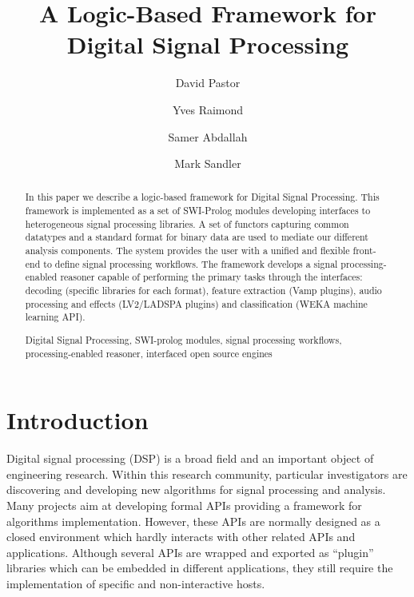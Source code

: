 \documentclass[runningheads]{llncs}
\newcommand{\keywords}[1]{\par\addvspace\baselineskip
\noindent\keywordname\enspace\ignorespaces#1}
\begin{document}
\mainmatter

\title{A Logic-Based Framework for Digital Signal Processing}


\author{David Pastor\and Yves Raimond\and Samer Abdallah\and Mark Sandler}


\maketitle


\begin{abstract}
In this paper we describe a logic-based framework for Digital Signal Processing. This framework is implemented as a set of SWI-Prolog modules developing interfaces to heterogeneous signal processing libraries. A set of functors capturing common datatypes and a standard format for binary data are used to mediate our different analysis components. The system provides the user with a unified and flexible front-end to define signal processing workflows. The framework develops a signal processing-enabled reasoner capable of performing the primary tasks through the interfaces: decoding (specific libraries for each format), feature extraction (Vamp plugins), audio processing and effects (LV2/LADSPA plugins) and classification (WEKA machine learning API).

\keywords{Digital Signal Processing, SWI-prolog modules, signal processing workflows, processing-enabled reasoner, interfaced open source engines}
\end{abstract}

\section{Introduction}\label{sec:intro}

Digital signal processing (DSP) is a broad field and an important object of engineering research. Within this research community, particular investigators are discovering and developing new algorithms for signal processing and analysis. Many projects aim at developing formal APIs providing a framework for algorithms implementation. However, these APIs are normally designed as a closed environment which hardly interacts with other related APIs and applications. Although several APIs are wrapped and exported as ``plugin'' libraries which can be embedded in different applications, they still require the implementation of specific and non-interactive hosts.
\end{document}

